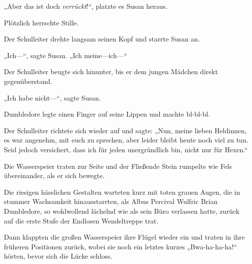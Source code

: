 „Aber das ist doch \emph{verrückt}!“, platzte es Susan heraus.

Plötzlich herrschte Stille.

Der Schulleiter drehte langsam seinen Kopf und starrte Susan an.

„Ich—“, sagte Susan. „Ich meine—ich—“

Der Schulleiter beugte sich hinunter, bis er dem jungen Mädchen direkt gegenüberstand.

„Ich habe nicht—“, sagte Susan.

Dumbledore legte einen Finger auf seine Lippen und machte bl-bl-bl.

Der Schulleiter richtete sich wieder auf und sagte: „Nun, meine lieben Heldinnen, es war angenehm, mit euch zu sprechen, aber leider bleibt heute noch viel zu tun. Seid jedoch versichert, dass ich für jeden unergründlich bin, nicht nur für Hexen.“

Die Wasserspeier traten zur Seite und der Fließende Stein rumpelte wie Fels übereinander, als er sich bewegte.

Die riesigen hässlichen Gestalten warteten kurz mit toten grauen Augen, die in stummer Wachsamkeit hinausstarrten, als Albus Percival Wulfric Brian Dumbledore, so wohlwollend lächelnd wie als sein Büro verlassen hatte, zurück auf die erste Stufe der Endlosen Wendeltreppe trat.

Dann klappten die großen Wasserspeier ihre Flügel wieder ein und traten in ihre früheren Positionen zurück, wobei sie noch ein letztes kurzes „Bwa-ha-ha-ha!“ hörten, bevor sich die Lücke schloss.

